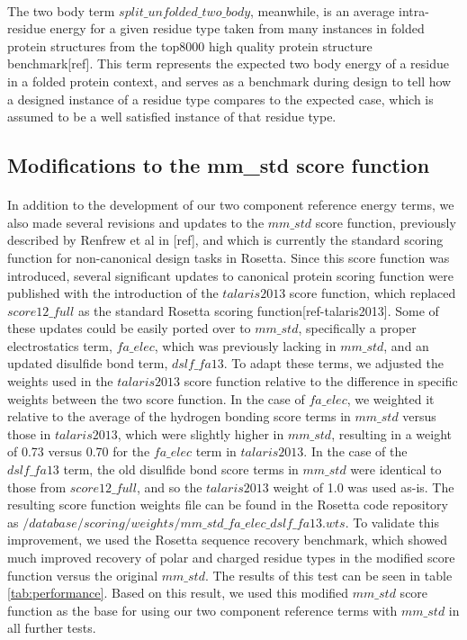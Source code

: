 \paragraph{}
The two body term $split\_unfolded\_two\_body$, meanwhile, is an average intra-residue energy for a given residue type taken from many instances in folded protein structures from the top8000 high quality protein structure benchmark[ref].
This term represents the expected two body energy of a residue in a folded protein context, and serves as a benchmark during design to tell how a designed instance of a residue type compares to the expected case, which is assumed to be a well satisfied instance of that residue type.


\subsection{Modifications to the mm\_std score function}
\paragraph{}
In addition to the development of our two component reference energy terms, we also made several revisions and updates to the $mm\_std$ score function, previously described by Renfrew et al in [ref], and which is currently the standard scoring function for non-canonical design tasks in Rosetta.
Since this score function was introduced, several significant updates to canonical protein scoring function were published with the introduction of the $talaris2013$ score function, which replaced $score12\_full$ as the standard Rosetta scoring function[ref-talaris2013].
Some of these updates could be easily ported over to $mm\_std$, specifically a proper electrostatics term, $fa\_elec$, which was previously lacking in $mm\_std$, and an updated disulfide bond term, $dslf\_fa13$.
To adapt these terms, we adjusted the weights used in the $talaris2013$ score function relative to the difference in specific weights between the two score function.
In the case of $fa\_elec$, we weighted it relative to the average of the hydrogen bonding score terms in $mm\_std$ versus those in $talaris2013$, which were slightly higher in $mm\_std$, resulting in a weight of 0.73 versus 0.70 for the $fa\_elec$ term in $talaris2013$.
In the case of the $dslf\_fa13$ term, the old disulfide bond score terms in $mm\_std$ were identical to those from $score12\_full$, and so the $talaris2013$ weight of 1.0 was used as-is.
The resulting score function weights file can be found in the Rosetta code repository as $/database/scoring/weights/mm\_std\_fa\_elec\_dslf\_fa13.wts$.
To validate this improvement, we used the Rosetta sequence recovery benchmark, which showed much improved recovery of polar and charged residue types in the modified score function versus the original $mm\_std$.
The results of this test can be seen in table \ref{tab:performance}.
Based on this result, we used this modified $mm\_std$ score function as the base for using our two component reference terms with $mm\_std$ in all further tests.



